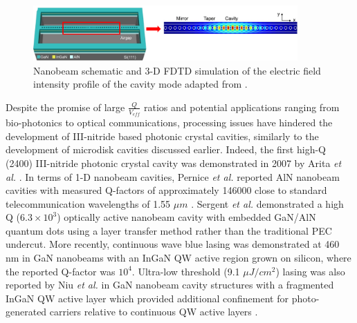 \begin{figure}[h]
	\centering
	\includegraphics[width=0.9\textwidth]{Figs/Ch1/nb1.png}
	\caption {Nanobeam schematic and 3-D FDTD simulation of the electric field intensity profile of the cavity mode adapted from \cite{Trivino2015}. }
	\label{1.16}
\end{figure}
\FloatBarrier 

Despite the promise of large $\frac{Q}{V_{eff}}$ ratios and potential applications ranging from bio-photonics to optical communications, processing issues have hindered the development of III-nitride based photonic crystal cavities, similarly to the development of microdisk cavities discussed earlier. Indeed, the first high-Q (2400) III-nitride photonic crystal cavity was demonstrated in 2007 by Arita {\it et al.} \cite{Arita2007}. In terms of 1-D nanobeam cavities, Pernice {\it et al.} reported AlN nanobeam cavities with measured Q-factors of approximately 146000 close to standard telecommunication wavelengths of 1.55 $\mu m$ \cite{Pernice2012}. Sergent {\it et al.} demonstrated a high Q ($6.3 \times 10^{3}$) optically active nanobeam cavity with embedded GaN/AlN quantum dots using a layer transfer method rather than the traditional PEC undercut. More recently, continuous wave blue lasing was demonstrated at 460 nm in GaN nanobeams with an InGaN QW active region  grown on silicon, where the reported Q-factor was $ 10^{4}$. Ultra-low threshold (9.1 $\mu J/cm^{2}$) lasing was also reported by Niu \textit{et al.} in GaN nanobeam cavity structures with a fragmented InGaN QW active layer which provided additional confinement for photo-generated carriers relative to continuous QW active layers \cite{Niu2015}.


